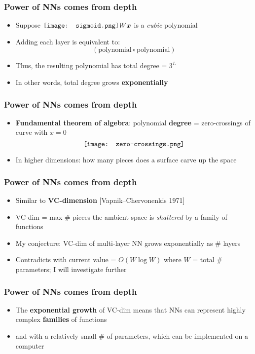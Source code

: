 \documentclass[17pt]{beamer}
\newcommand{\vect}[1]{\boldsymbol{#1}}
\newcommand*\sigmoid{\vcenter{\hbox{\texttt{[image: sigmoid.png]}}}}
\begin{document}
\begin{frame}
\frametitle{Power of NNs comes from depth}
\begin{itemize}
	\item Suppose $\sigmoid W \vect{x}$ is a \textit{cubic} polynomial
	\item Adding each layer is equivalent to:
	\begin{equation}
	 (\mbox{polynomial} \circ \mbox{polynomial})
	\end{equation}
	\item Thus, the resulting polynomial has total degree = $3^L$
	\item In other words, total degree grows  {\color{red}\textbf{exponentially}}
\end{itemize}
\end{frame}

\begin{frame}
\frametitle{Power of NNs comes from depth}
\begin{itemize}
	\item \textbf{Fundamental theorem of algebra}: polynomial \textbf{degree} = zero-crossings of curve with $x=0$
	\begin{equation}
	\vcenter{\hbox{\texttt{[image: zero-crossings.png]}}}
	\end{equation}
	\item In higher dimensions: {\color{red}how many pieces} does a surface carve up the space
\end{itemize}
\end{frame}

\begin{frame}
\frametitle{Power of NNs comes from depth}
\begin{itemize}
	\item Similar to \textbf{VC-dimension} [Vapnik–Chervonenkis 1971] 
	\item VC-dim = max \# pieces the ambient space is \textit{shattered} by a family of functions
	\item My conjecture: VC-dim of multi-layer NN grows exponentially as \# layers
	\item Contradicts with current value = $O(W \log W)$ where $W$ = total \# parameters; I will investigate further
\end{itemize}
\end{frame}

\begin{frame}
\frametitle{Power of NNs comes from depth}
\begin{itemize}
	\item The {\color{red}\textbf{exponential growth}} of VC-dim means that NNs can represent highly complex \textbf{families} of functions
	\item and with a relatively small \# of parameters, which can be implemented on a computer
\end{itemize}
\end{frame}
\end{document}
